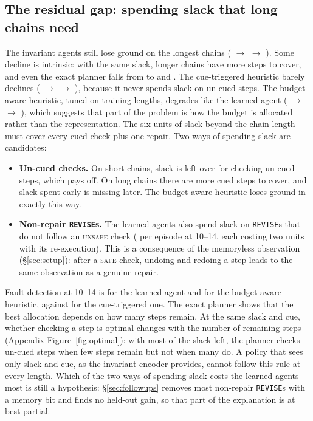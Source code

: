 \subsection{The residual gap: spending slack that long chains need}
\label{sec:residual}

The invariant agents still lose ground on the longest chains ( $\to$  $\to$ ). Some decline is intrinsic: with the same slack, longer chains have more steps to cover, and even the exact planner falls from  to  and . The cue-triggered heuristic barely declines ( $\to$  $\to$ ), because it never spends slack on un-cued steps. The budget-aware heuristic, tuned on training lengths, degrades like the learned agent ( $\to$  $\to$ ), which suggests that part of the problem is how the budget is allocated rather than the representation. The six units of slack beyond the chain length must cover every cued check plus one repair. Two ways of spending slack are candidates:
\begin{itemize}
  \item \textbf{Un-cued checks.} On short chains, slack is left over for checking un-cued steps, which pays off. On long chains there are more cued steps to cover, and slack spent early is missing later. The budget-aware heuristic loses ground in exactly this way.
  \item \textbf{Non-repair \texttt{REVISE}s.} The learned agents also spend slack on \texttt{REVISE}s that do not follow an \textsc{unsafe} check ( per episode at 10--14, each costing two units with its re-execution). This is a consequence of the memoryless observation (\S\ref{sec:setup}): after a \textsc{safe} check, undoing and redoing a step leads to the same observation as a genuine repair.
\end{itemize}
Fault detection at 10--14 is  for the learned agent and  for the budget-aware heuristic, against  for the cue-triggered one. The exact planner shows that the best allocation depends on how many steps remain. At the same slack and cue, whether checking a step is optimal changes with the number of remaining steps (Appendix Figure~\ref{fig:optimal}): with most of the slack left, the planner checks un-cued steps when few steps remain but not when many do. A policy that sees only slack and cue, as the invariant encoder provides, cannot follow this rule at every length. Which of the two ways of spending slack costs the learned agents most is still a hypothesis: \S\ref{sec:followups} removes most non-repair \texttt{REVISE}s with a memory bit and finds no held-out gain, so that part of the explanation is at best partial.


